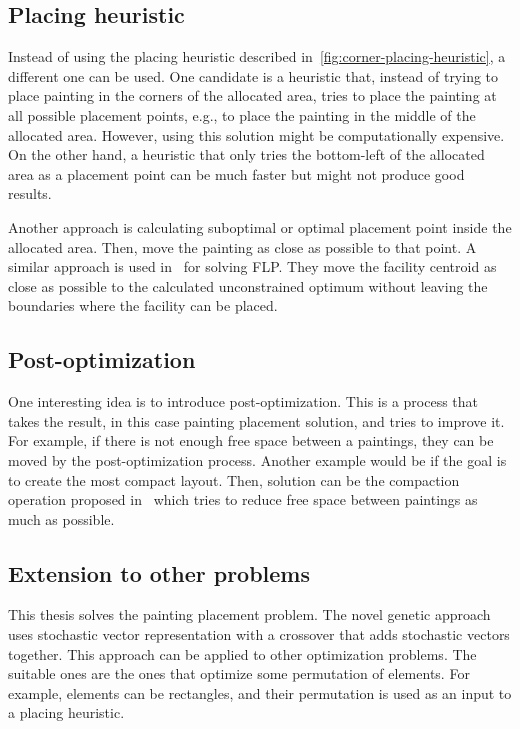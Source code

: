 \subsection{Placing heuristic}\label{subsec:placing-heuristic}

Instead of using the placing heuristic described in~\ref{fig:corner-placing-heuristic}, a different one can be used.
One candidate is a heuristic that, instead of trying to place painting in the corners of the allocated area,
tries to place the painting at all possible placement points, e.g., to place the painting in the middle of the allocated area.
However, using this solution might be computationally expensive.
On the other hand, a heuristic that only tries the bottom-left of the allocated area as a placement point can be much faster but
might not produce good results.

Another approach is calculating suboptimal or optimal placement point inside the allocated area.
Then, move the painting as close as possible to that point.
A similar approach is used in~\cite{goncalvesBiasedRandomkeyGenetic2015} for solving FLP.
They move the facility centroid as close as possible to the calculated unconstrained optimum without leaving the
boundaries where the facility can be placed.

\subsection{Post-optimization}\label{subsec:post-optimization}

One interesting idea is to introduce post-optimization.
This is a process that takes the result, in this case painting placement solution,
and tries to improve it.
For example, if there is not enough free space between a paintings, they can be moved by the post-optimization process.
Another example would be if the goal is to create the most compact layout.
Then, solution can be the compaction operation proposed in~\cite{laiSlicingTreeComplete2001}
which tries to reduce free space between paintings as much as possible.

\subsection{Extension to other problems}\label{subsec:extension-to-other-problems}

This thesis solves the painting placement problem.
The novel genetic approach uses stochastic vector representation with a crossover that adds stochastic vectors together.
This approach can be applied to other optimization problems.
The suitable ones are the ones that optimize some permutation of elements.
For example, elements can be rectangles, and their permutation is used
as an input to a placing heuristic.

